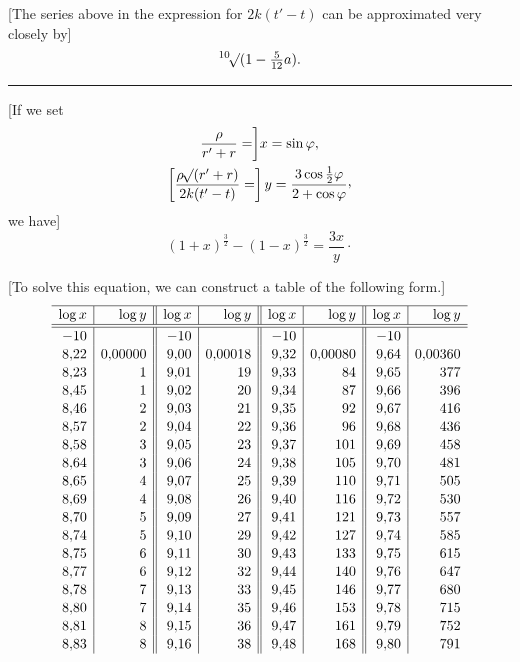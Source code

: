 [The series above in the expression for \(2k(t'-t)\) can be approximated very closely by]
\[
\BareRoot[10]{(1-\tfrac5{12}a)}.
\]
\begin{center}\rule{.3\linewidth}{.4pt}\end{center}

[If we set
\[
\begin{gathered}
\frac{\rho}{r'+r}=\biggr]x=\sin\varphi,\\
\left[\frac{\rho\BareRoot{(r'+r)}}{2k(t'-t)}=\right]y=\frac{3\cos\tfrac12\varphi}{2+\cos\varphi}\mathpunct{\raisebox{.45ex}{,}}
\end{gathered}
\]
we have]
\[
(1+x)^{\frac32}-(1-x)^{\frac32}=\frac{3x}y\mathpunct{\cdot}
\]

[To solve this equation, we can construct a table of the following form.]
\[
\setlength{\arraycolsep}{5pt}
\renewcommand{\arraystretch}{1.08}
\begin{array}{r|r||r|r||r|r||r|r}
\hline
\log x&\log y&\log x&\log y&\log x&\log y&\log x&\log y\\
\hline\hline
-10&&-10&&-10&&-10&\\
8{,}22&0{,}00000&9{,}00&0{,}00018&9{,}32&0{,}00080&9{,}64&0{,}00360\\
8{,}23&1&9{,}01&19&9{,}33&84&9{,}65&377\\
8{,}45&1&9{,}02&20&9{,}34&87&9{,}66&396\\
8{,}46&2&9{,}03&21&9{,}35&92&9{,}67&416\\
8{,}57&2&9{,}04&22&9{,}36&96&9{,}68&436\\
8{,}58&3&9{,}05&23&9{,}37&101&9{,}69&458\\
8{,}64&3&9{,}06&24&9{,}38&105&9{,}70&481\\
8{,}65&4&9{,}07&25&9{,}39&110&9{,}71&505\\
8{,}69&4&9{,}08&26&9{,}40&116&9{,}72&530\\
8{,}70&5&9{,}09&27&9{,}41&121&9{,}73&557\\
8{,}74&5&9{,}10&29&9{,}42&127&9{,}74&585\\
8{,}75&6&9{,}11&30&9{,}43&133&9{,}75&615\\
8{,}77&6&9{,}12&32&9{,}44&140&9{,}76&647\\
8{,}78&7&9{,}13&33&9{,}45&146&9{,}77&680\\
8{,}80&7&9{,}14&35&9{,}46&153&9{,}78&715\\
8{,}81&8&9{,}15&36&9{,}47&161&9{,}79&752\\
8{,}83&8&9{,}16&38&9{,}48&168&9{,}80&791\\

\end{array}\]
